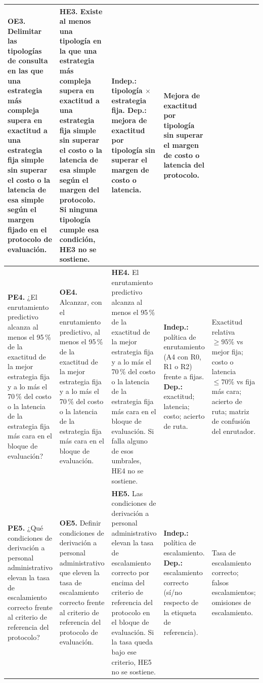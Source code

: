 \documentclass[10pt,a4paper,landscape]{article}
\begin{document}
{\begin{tabularx}{\linewidth}{|Y|Y|Y|Y|Y|}
\textbf{OE3.} Delimitar las tipologías de consulta en las que una estrategia más compleja supera en exactitud a una estrategia fija simple sin superar el costo o la latencia de esa simple según el margen fijado en el protocolo de evaluación. &
\textbf{HE3.} Existe al menos una tipología en la que una estrategia más compleja supera en exactitud a una estrategia fija simple sin superar el costo o la latencia de esa simple según el margen del protocolo. Si ninguna tipología cumple esa condición, HE3 no se sostiene. &
\textbf{Indep.:} tipología $\times$ estrategia fija. \textbf{Dep.:} mejora de exactitud por tipología sin superar el margen de costo o latencia. &
Mejora de exactitud por tipología sin superar el margen de costo o latencia del protocolo. \\
\hline
\textbf{PE4.} ¿El enrutamiento predictivo alcanza al menos el 95\,\% de la exactitud de la mejor estrategia fija y a lo más el 70\,\% del costo o la latencia de la estrategia fija más cara en el bloque de evaluación? &
\textbf{OE4.} Alcanzar, con el enrutamiento predictivo, al menos el 95\,\% de la exactitud de la mejor estrategia fija y a lo más el 70\,\% del costo o la latencia de la estrategia fija más cara en el bloque de evaluación. &
\textbf{HE4.} El enrutamiento predictivo alcanza al menos el 95\,\% de la exactitud de la mejor estrategia fija y a lo más el 70\,\% del costo o la latencia de la estrategia fija más cara en el bloque de evaluación. Si falla alguno de esos umbrales, HE4 no se sostiene. &
\textbf{Indep.:} política de enrutamiento (A4 con R0, R1 o R2) frente a fijas. \textbf{Dep.:} exactitud; latencia; costo; acierto de ruta. &
Exactitud relativa $\geq 95\%$ vs mejor fija; costo o latencia $\leq 70\%$ vs fija más cara; acierto de ruta; matriz de confusión del enrutador. \\
\hline
\textbf{PE5.} ¿Qué condiciones de derivación a personal administrativo elevan la tasa de escalamiento correcto frente al criterio de referencia del protocolo? &
\textbf{OE5.} Definir condiciones de derivación a personal administrativo que eleven la tasa de escalamiento correcto frente al criterio de referencia del protocolo de evaluación. &
\textbf{HE5.} Las condiciones de derivación a personal administrativo elevan la tasa de escalamiento correcto por encima del criterio de referencia del protocolo en el bloque de evaluación. Si la tasa queda bajo ese criterio, HE5 no se sostiene. &
\textbf{Indep.:} política de escalamiento. \textbf{Dep.:} escalamiento correcto (sí/no respecto de la etiqueta de referencia). &
Tasa de escalamiento correcto; falsos escalamientos; omisiones de escalamiento. \\

\end{tabularx}}
\end{document}
